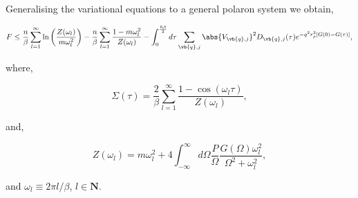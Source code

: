 Generalising the variational equations to a general polaron system we obtain,

\begin{equation}
    F \leq \frac{n}{\beta} \sum_{l=1}^\infty \ln \left( \frac{Z(\omega_l)}{m \omega_l^2} \right) - \frac{n}{\beta} \sum_{l=1}^\infty \frac{1 - m \omega^2_l}{Z(\omega_l)} - \int_0^{\frac{\hbar\beta}{2}} d\tau \sum_{\vb{q}, j} \abs{V_{\vb{q}, j}}^2 D_{\vb{q}, j}(\tau) e^{-q^2 r_p^2 \left[G(0) - G(\tau)\right]},
\end{equation}

where,

\begin{equation}
    \Sigma(\tau) = \frac{2}{\beta} \sum_{l = 1}^\infty \frac{1 - \cos\left(\omega_l \tau \right)}{Z(\omega_l)},
\end{equation}

and,

\begin{equation}
    Z(\omega_l) = m \omega_l^2 + 4 \int_{-\infty}^\infty d\Omega \frac{P}{\Omega} \frac{G(\Omega) \omega^2_l}{\Omega^2 + \omega_l^2},
\end{equation}

and $\omega_l \equiv 2\pi l / \beta$, $l \in \mathbf{N}$.